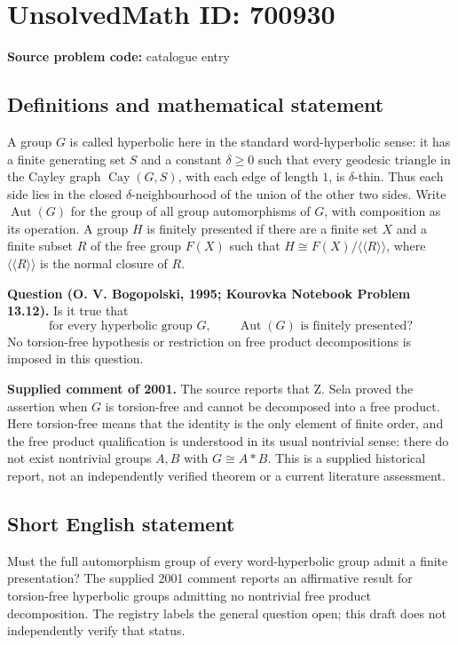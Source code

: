 \documentclass[11pt]{article}
\begin{document}
\section*{UnsolvedMath ID: 700930}
\textbf{Source problem code:} catalogue entry
\subsection{Definitions and mathematical statement}
A group \(G\) is called hyperbolic here in the standard word-hyperbolic sense: it has a finite generating set \(S\) and a constant \(\delta\geq 0\) such that every geodesic triangle in the Cayley graph \(\operatorname{Cay}(G,S)\), with each edge of length \(1\), is \(\delta\)-thin. Thus each side lies in the closed \(\delta\)-neighbourhood of the union of the other two sides. Write \(\operatorname{Aut}(G)\) for the group of all group automorphisms of \(G\), with composition as its operation. A group \(H\) is finitely presented if there are a finite set \(X\) and a finite subset \(R\) of the free group \(F(X)\) such that \(H\cong F(X)/\langle\!\langle R\rangle\!\rangle\), where \(\langle\!\langle R\rangle\!\rangle\) is the normal closure of \(R\).

\textbf{Question (O. V. Bogopolski, 1995; Kourovka Notebook Problem 13.12).} Is it true that
\[
\text{for every hyperbolic group }G,\qquad \operatorname{Aut}(G)\text{ is finitely presented}?
\]
No torsion-free hypothesis or restriction on free product decompositions is imposed in this question.

\textbf{Supplied comment of 2001.} The source reports that Z. Sela proved the assertion when \(G\) is torsion-free and cannot be decomposed into a free product. Here torsion-free means that the identity is the only element of finite order, and the free product qualification is understood in its usual nontrivial sense: there do not exist nontrivial groups \(A,B\) with \(G\cong A*B\). This is a supplied historical report, not an independently verified theorem or a current literature assessment.
\subsection{Short English statement}
Must the full automorphism group of every word-hyperbolic group admit a finite presentation? The supplied 2001 comment reports an affirmative result for torsion-free hyperbolic groups admitting no nontrivial free product decomposition. The registry labels the general question open; this draft does not independently verify that status.
\end{document}
